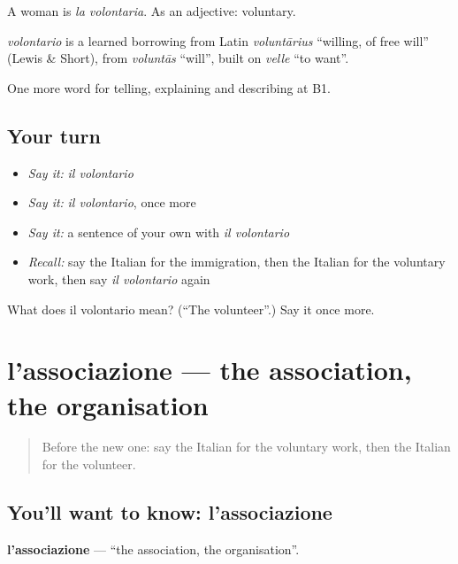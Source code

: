A woman is \emph{la volontaria}. As an adjective: voluntary.

\begin{cousinweb}
\emph{volontario} is a learned borrowing from Latin \emph{voluntārius} \textquotedblleft{}willing, of free will\textquotedblright{} (Lewis \& Short), from \emph{voluntās} \textquotedblleft{}will\textquotedblright{}, built on \emph{velle} \textquotedblleft{}to want\textquotedblright{}.
\end{cousinweb}

\begin{grammarlens}[title={What you've built}]
One more word for telling, explaining and describing at B1.
\end{grammarlens}

\subsection*{Your turn}
\begin{itemize}
\raggedright
  \item \emph{Say it:} \emph{il volontario}
  \item \emph{Say it:} \emph{il volontario}, once more
  \item \emph{Say it:} a sentence of your own with \emph{il volontario}
  \item \emph{Recall:} say the Italian for the immigration, then the Italian for the voluntary work, then say \emph{il volontario} again
\end{itemize}

\begin{tcolorbox}[breakable,colback=teal!4,colframe=teal!35!black,title={Before you move on}]
What does il volontario mean? (\textquotedblleft{}The volunteer\textquotedblright{}.) Say it once more.
\end{tcolorbox}
\section[l'associazione]{l'associazione — the association, the organisation}

\label{lesson:IT-C367-associazione}



\begin{quote}
Before the new one: say the Italian for the voluntary work, then the Italian for the volunteer.
\end{quote}

\subsection*{You'll want to know: l'associazione}
\textbf{l'associazione} — \textquotedblleft{}the association, the organisation\textquotedblright{}.

